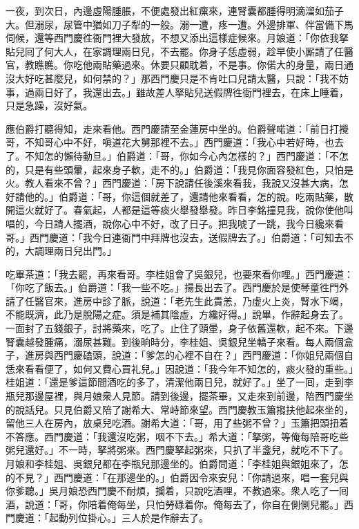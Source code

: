 一夜，到次日，內邊虛陽腫脹，不便處發出紅瘰來，連腎囊都腫得明滴溜如茄子大。但溺尿，尿管中猶如刀子犁的一般。溺一遭，疼一遭。外邊排軍、伴當備下馬伺候，還等西門慶徃衙門裡大發放，不想又添出這樣症候來。月娘道：「你依我拏貼兒囘了何大人，在家調理兩日兒，不去罷。你身子恁虛弱，趁早使小厮請了任醫官，教瞧瞧。你吃他兩貼藥過來。休要只顧耽着，不是事。你偌大的身量，兩日通沒大好吃甚麼兒，如何禁的？」那西門慶只是不肯吐口兒請太醫，只說：「我不妨事，過兩日好了，我還出去。」雖故差人拏貼兒送假牌徃衙門裡去，在床上睡着，只是急躁，沒好氣。

應伯爵打聽得知，走來看他。西門慶請至金蓮房中坐的。伯爵聲喏道：「前日打攪哥，不知哥心中不好，嗔道花大舅那裡不去。」西門慶道：「我心中若好時，也去了。不知怎的懶待動旦。」伯爵道：「哥，你如今心內怎樣的？」西門慶道：「不怎的，只是有些頭暈，起來身子軟，走不的。」伯爵道：「我見你面容發紅色，只怕是火。教人看來不曾？」西門慶道：「房下說請任後溪來看我，我說又沒甚大病，怎好請他的。」伯爵道：「哥，你這個就差了，還請他來看看，怎的說。吃兩貼藥，散開這火就好了。春氣起，人都是這等痰火舉發舉發。昨日李銘撞見我，說你使他叫唱的，今日請人擺酒，說你心中不好，改了日子。把我唬了一跳，我今日纔來看哥。」西門慶道：「我今日連衙門中拜牌也沒去，送假牌去了。」伯爵道：「可知去不的，大調理兩日兒出門。」

吃畢茶道：「我去罷，再來看哥。李桂姐會了吳銀兒，也要來看你哩。」西門慶道：「你吃了飯去。」伯爵道：「我一些不吃。」揚長出去了。西門慶於是使琴童徃門外請了任醫官來，進房中診了脈，說道：「老先生此貴恙，乃虛火上炎，腎水下竭，不能既濟，此乃是脫陽之症。須是補其陰虛，方纔好得。」{}說畢，作辭起身去了。一面封了五錢銀子，討將藥來，吃了。止住了頭暈，{}身子依舊還軟，起不來。下邊腎囊越發腫痛，溺尿甚難。到後晌時分，李桂姐、吳銀兒坐轎子來看。每人兩個盒子，進房與西門慶磕頭，說道：「爹怎的心裡不自在？」西門慶道：「你姐兒兩個自恁來看看便了，如何又費心買礼兒。」因說道：「我今年不知怎的，痰火發的重些。」桂姐道：「還是爹這節間酒吃的多了，清潔他兩日兒，就好了。」坐了一囘，走到李瓶兒那邊屋裡，與月娘衆人見節。請到後邊，擺茶畢，又走來到前邊，陪西門慶坐的說話兒。只見伯爵又陪了謝希大、常峙節來望。西門慶教玉簫搊扶他起來坐的，留他三人在房內，放桌兒吃酒。謝希大道：「哥，用了些粥不曾？」玉簫把頭扭着不答應。西門慶道：「我還沒吃粥，咽不下去。」希大道：「拏粥，等俺每陪哥吃些粥兒還好。」不一時，拏將粥來。西門慶拏起粥來，只扒了半盞兒，就吃不下了。月娘和李桂姐、吳銀兒都在李瓶兒那邊坐的。伯爵問道：「李桂姐與銀姐來了，怎的不見？」西門慶道：「在那邊坐的。」伯爵因令來安兒：「你請過來，唱一套兒與你爹聽。」吳月娘恐西門慶不耐煩，攔着，只說吃酒哩，不教過來。衆人吃了一囘酒，說道：「哥，你陪着俺每坐，只怕勞碌着你。俺每去了，你自在側側兒罷。」西門慶道：「起動列位掛心。」三人於是作辭去了。


